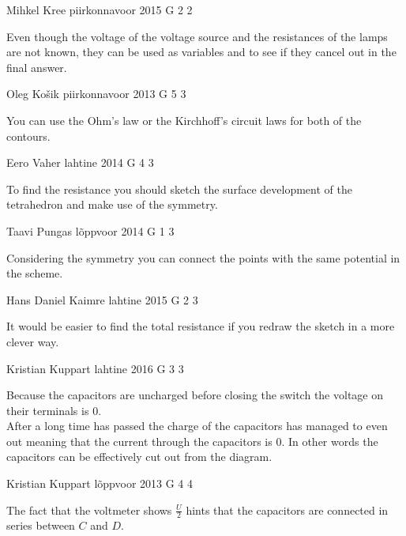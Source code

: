 \documentclass[11pt]{article}
\begin{document}
{Mihkel Kree} %
{piirkonnavoor} %
{2015} %
{G 2} %
{2} %
{

\ifEngHint
Even though the voltage of the voltage source and the resistances of the lamps are not known, they can be used as variables and to see if they cancel out in the final answer.
\fi
}

{Oleg Košik} %
{piirkonnavoor} %
{2013} %
{G 5} %
{3} %
{

\ifEngHint
You can use the Ohm’s law or the Kirchhoff’s circuit laws for both of the contours.
\fi
}

{Eero Vaher} %
{lahtine} %
{2014} %
{G 4} %
{3} %
{

\ifEngHint
To find the resistance you should sketch the surface development of the tetrahedron and make use of the symmetry.
\fi
}

{Taavi Pungas} %
{lõppvoor} %
{2014} %
{G 1} %
{3} %
{

\ifEngHint
Considering the symmetry you can connect the points with the same potential in the scheme.
\fi
}

{Hans Daniel Kaimre} %
{lahtine} %
{2015} %
{G 2} %
{3} %
{

\ifEngHint
It would be easier to find the total resistance if you redraw the sketch in a more clever way.
\fi
}

{Kristian Kuppart} %
{lahtine} %
{2016} %
{G 3} %
{3} %
{

\ifEngHint
Because the capacitors are uncharged before closing the switch the voltage on their terminals is $0$.\\
After a long time has passed the charge of the capacitors has managed to even out meaning that the current through the capacitors is $0$. In other words the capacitors can be effectively cut out from the diagram.
\fi
}

{Kristian Kuppart} %
{lõppvoor} %
{2013} %
{G 4} %
{4} %
{

\ifEngHint
The fact that the voltmeter shows $\frac{U}{2}$ hints that the capacitors are connected in series between $C$ and $D$.
\fi
}
\end{document}
